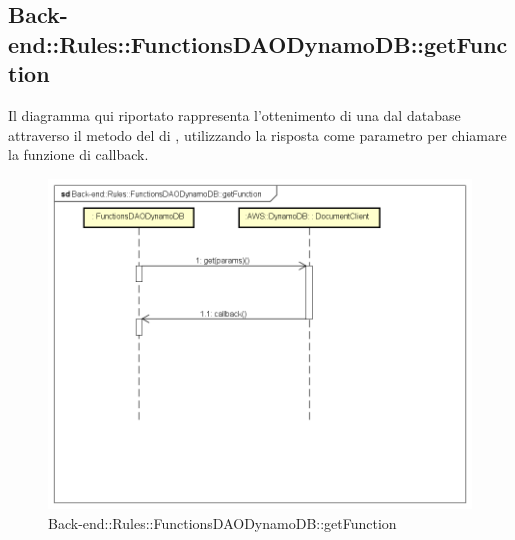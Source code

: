 \subsection{Back-end::Rules::FunctionsDAODynamoDB::getFunction}
Il diagramma qui riportato rappresenta l'ottenimento di una  dal database attraverso il metodo  del  di , utilizzando la risposta come parametro per chiamare la funzione di callback.
\begin{figure}[h] \centering \includegraphics[width=\textwidth,height=\textheight,keepaspectratio]{images/diagrams/back-end/Ufficial_Backend/Back-endRulesFunctionsDAODynamoDBgetFunction.png} 	\caption{Back-end::Rules::FunctionsDAODynamoDB::getFunction}
\end{figure}
\newpage

